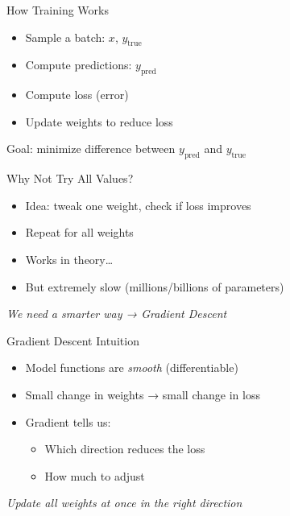 \documentclass{beamer}
\begin{document}
\begin{frame}{How Training Works}
    \begin{itemize}
        \item Sample a batch: $x$, $y_{\text{true}}$
        \item Compute predictions: $y_{\text{pred}}$
        \item Compute loss (error)
        \item Update weights to reduce loss
    \end{itemize}

    \vspace{0.5em}
    \small Goal: minimize difference between $y_{\text{pred}}$ and $y_{\text{true}}$
\end{frame}

\begin{frame}{Why Not Try All Values?}
    \begin{itemize}
        \item Idea: tweak one weight, check if loss improves
        \item Repeat for all weights
    \end{itemize}

    \vspace{0.5em}
    \begin{itemize}
        \item Works in theory…
        \item But extremely slow (millions/billions of parameters)
    \end{itemize}

    \vspace{0.5em}
    \centering
    \textit{We need a smarter way → Gradient Descent}
\end{frame}

\begin{frame}{Gradient Descent Intuition}
    \begin{itemize}
        \item Model functions are \textit{smooth} (differentiable)
        \item Small change in weights → small change in loss
        \item Gradient tells us:
              \begin{itemize}
                  \item Which direction reduces the loss
                  \item How much to adjust
              \end{itemize}
    \end{itemize}

    \vspace{0.5em}
    \centering
    \textit{Update all weights at once in the right direction}
\end{frame}
\end{document}

